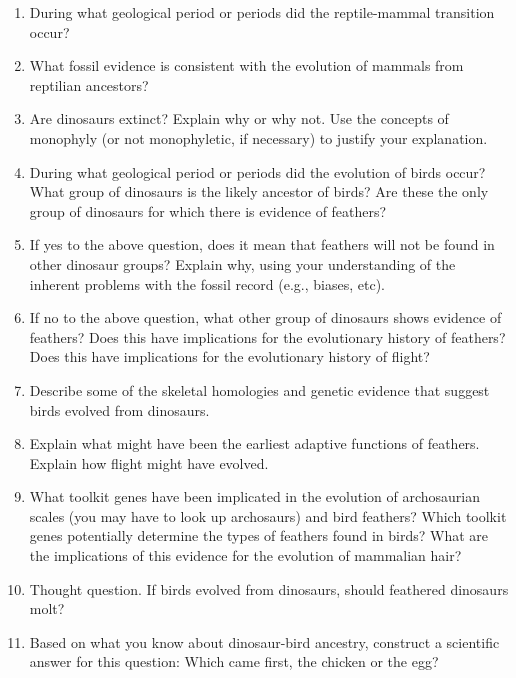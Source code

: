 \documentclass[letterpaper]{tufte-handout}
\begin{document}
\begin{enumerate}
	\item During what geological period or periods did the reptile-mammal transition occur?

	\item What fossil evidence is consistent with the evolution of mammals from reptilian ancestors?

	\item Are dinosaurs extinct?  Explain why or why not.  Use the concepts of monophyly (or not monophyletic, if necessary) to justify your explanation.

	\item During what geological period or periods did the evolution of birds occur?  What group of dinosaurs is the likely ancestor of birds?  Are these the only group of dinosaurs for which there is evidence of feathers?  

	\item If yes to the above question, does it mean that feathers will not be found in other dinosaur groups?  Explain why, using your understanding of the inherent problems with the fossil record (e.g., biases, etc).

	\item If no to the above question, what other group of dinosaurs shows evidence of feathers?  Does this have implications for the evolutionary history of feathers?  Does this have implications for the evolutionary history of flight?

	\item Describe some of the skeletal homologies and genetic evidence that suggest birds evolved from dinosaurs.

	\item Explain what might have been the earliest adaptive functions of feathers.  Explain how flight might have evolved.

	\item What toolkit genes have been implicated in the evolution of archosaurian scales (you may have to look up archosaurs) and bird feathers?  Which toolkit genes potentially determine the types of feathers found in birds?  What are the implications of this evidence for the evolution of mammalian hair? 

	\item Thought question.  If birds evolved from dinosaurs, should feathered dinosaurs molt?

	\item Based on what you know about dinosaur-bird ancestry, construct a scientific answer for this question: Which came first, the chicken or the egg?

\end{enumerate}
\end{document}

